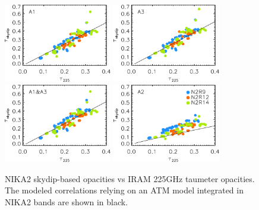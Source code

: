 \begin{figure}[ht!]
  \begin{center}
    \includegraphics[clip=true, trim={0, -0.3cm, -0.3cm, 0}, width=0.42\textwidth]{Figures/Opacity/Opacity_correl_skydip_vs_tau_a1.pdf}
    \includegraphics[clip=true, trim={0, -0.3cm, -0.3cm, 0}, width=0.42\textwidth]{Figures/Opacity/Opacity_correl_skydip_vs_tau_a3.pdf}
    \includegraphics[clip=true, trim={0, -0.3cm, -0.3cm, 0}, width=0.42\textwidth]{Figures/Opacity/Opacity_correl_skydip_vs_tau_1mm.pdf}
    \includegraphics[clip=true, trim={0, -0.3cm, -0.3cm, 0}, width=0.42\textwidth]{Figures/Opacity/Opacity_correl_skydip_vs_tau_a2.pdf}
   \caption[NIKA2 skydip-based vs taumeter opacities]{ NIKA2
    skydip-based opacities vs IRAM 225GHz taumeter opacities. The
    modeled correlations relying on an ATM model integrated in NIKA2
    bands are shown in black.} 
\label{fig:skydip-to-taumeter-correl}
\end{center}
\end{figure}


